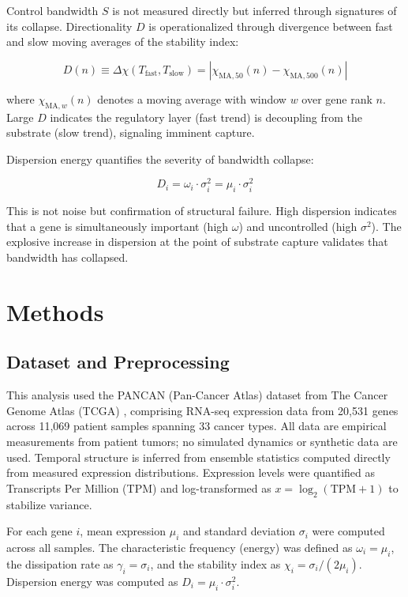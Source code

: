 \documentclass[11pt,letterpaper]{article}
\begin{document}
Control bandwidth $S$ is not measured directly but inferred through signatures of its collapse. Directionality $D$ is operationalized through divergence between fast and slow moving averages of the stability index:

\begin{equation}
D(n) \equiv \Delta\chi(T_{\text{fast}}, T_{\text{slow}}) = |\chi_{\text{MA},50}(n) - \chi_{\text{MA},500}(n)|
\label{eq:directionality}
\end{equation}

where $\chi_{\text{MA},w}(n)$ denotes a moving average with window $w$ over gene rank $n$. Large $D$ indicates the regulatory layer (fast trend) is decoupling from the substrate (slow trend), signaling imminent capture.

Dispersion energy quantifies the severity of bandwidth collapse:

\begin{equation}
D_i = \omega_i \cdot \sigma_i^2 = \mu_i \cdot \sigma_i^2
\label{eq:dispersion}
\end{equation}

This is not noise but confirmation of structural failure. High dispersion indicates that a gene is simultaneously important (high $\omega$) and uncontrolled (high $\sigma^2$). The explosive increase in dispersion at the point of substrate capture validates that bandwidth has collapsed.

\section{Methods}

\subsection{Dataset and Preprocessing}

This analysis used the PANCAN (Pan-Cancer Atlas) dataset from The Cancer Genome Atlas (TCGA) \cite{TCGA2018}, comprising RNA-seq expression data from 20,531 genes across 11,069 patient samples spanning 33 cancer types. All data are empirical measurements from patient tumors; no simulated dynamics or synthetic data are used. Temporal structure is inferred from ensemble statistics computed directly from measured expression distributions. Expression levels were quantified as Transcripts Per Million (TPM) and log-transformed as $x = \log_2(\text{TPM} + 1)$ to stabilize variance.

For each gene $i$, mean expression $\mu_i$ and standard deviation $\sigma_i$ were computed across all samples. The characteristic frequency (energy) was defined as $\omega_i = \mu_i$, the dissipation rate as $\gamma_i = \sigma_i$, and the stability index as $\chi_i = \sigma_i / (2\mu_i)$. Dispersion energy was computed as $D_i = \mu_i \cdot \sigma_i^2$.
\end{document}
